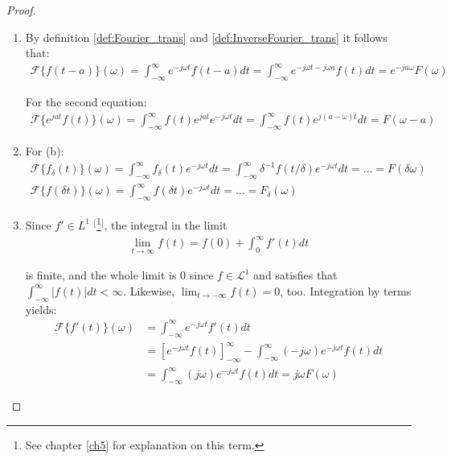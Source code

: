 \begin{proof}
\begin{enumerate}[label=(\alph*)]
\item
By definition \ref{def:Fourier_trans} and \ref{def:InverseFourier_trans} it follows that:
\begin{align*}
\mathcal{F}\{f(t-a)\}(\omega) = \int_{-\infty}^\infty e^{-j\omega t} f(t - a) dt = \int_{-\infty}^\infty e^{-j\omega t - j\omega a} f(t) dt = e^{-ja \omega} F(\omega)
\end{align*}

For the second equation:
\begin{align*}
\mathcal{F}\{e^{jat} f(t)\}(\omega) = \int_{-\infty}^\infty f(t) e^{jat} e^{-j \omega t} dt = \int_{-\infty}^\infty f(t) e^{j(a- \omega)t} dt = F(\omega - a)
\end{align*}

\item For (b): 
\begin{align*}
\mathcal{F}\{f_\delta(t)\}(\omega) = \int_{-\infty}^\infty f_\delta(t) e^{-j \omega t} dt = \int_{-\infty}^\infty \delta^{-1}f(t/\delta) e^{-j \omega t} dt = \dots = F(\delta\omega) \\
\mathcal{F}\{f(\delta t)\}(\omega) = \int_{-\infty}^\infty f(\delta t) e^{-j \omega t} dt = \dots = F_\delta(\omega)
\end{align*}

\item Since $f' \in L^1$ $^[$\footnote{See chapter \ref{ch5} for explanation on this term.}$^]$, the integral in the limit
\begin{align*}
\lim_{t \to \infty} f(t) = f(0) + \int_0^\infty f'(t) dt
\end{align*}

is finite, and the whole limit is 0 since $f\in \mathcal{L}^1$ and satisfies that $\int_{-\infty}^\infty |f(t)| dt < \infty$. Likewise, $\displaystyle{\lim_{t \to -\infty} f(t) = 0}$, too. Integration by terms yields:
\begin{align*}
\mathcal{F}\{f'(t)\}(\omega) &= \int_{-\infty}^\infty e^{-j \omega t} f'(t) dt \\
&= \left[ e^{-j\omega t} f(t) \right]_{-\infty}^\infty - \int_{-\infty}^\infty (-j \omega) e^{-j \omega t} f(t) dt \\
&= \int_{-\infty}^\infty (j \omega) e^{-j \omega t} f(t) dt = j\omega F(\omega)
\end{align*}


\end{enumerate}
\end{proof}
